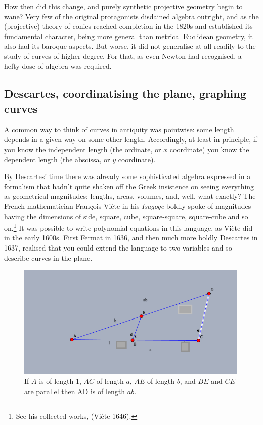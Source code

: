 \documentclass[11pt]{article}
\begin{document}
How then did this change, and purely synthetic projective geometry begin to wane? Very few of the original protagonists disdained algebra outright, and as the (projective) theory of conics reached completion in the 1820s and established its fundamental character, being more general than metrical Euclidean geometry, it also had its baroque aspects. But worse, it did not generalise at all readily  to the study of curves of higher degree. For that, as even Newton had recognised, a hefty dose of algebra was required.







\subsection{Descartes,  coordinatising the plane,  graphing  curves}
A common way to think of curves in antiquity was pointwise: some length depends in a given way on some other length. Accordingly, at least in principle, if you know the independent length
(the ordinate, or $x$ coordinate) you know the dependent length (the abscissa, or $y$ coordinate).  

By Descartes' time there was already some sophisticated algebra expressed in a formalism that hadn't quite shaken off   the Greek insistence on seeing everything as geometrical magnitudes: lengths, areas, volumes, and, well, what exactly? The French mathematician Fran\c{c}ois Vi\`ete in his \emph{Isagoge} boldly spoke of magnitudes having the dimensions of side, square, cube, square-square, square-cube and so on.\footnote{See his collected works, (Vi\'ete 1646).} It was possible to write polynomial equations in this language, as Vi\`ete did in the early 1600s. First Fermat in 1636, and then much more boldly Descartes in 1637, realised that you could extend the language to two variables and so describe curves in the plane.



\bigskip
\begin{center}
    \begin{figure}
   \begin{center}  \includegraphics[width=30em]{Multiplication.png} 
   \end{center}
     \protect \caption{If $A$ is of length 1, $AC$ of length $a$, $AE$ of length $b$, and $BE$ and $CE$ are parallel then AD is of length $ab.$}
      \label{figMacaulay}
     \end{figure}
\end{center}
\end{document}

